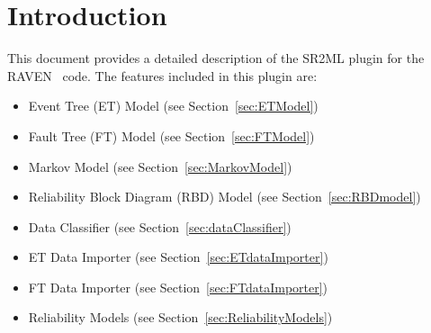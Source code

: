 \section{Introduction}
\label{sec:Introduction}

This document provides a detailed description of the SR2ML plugin for the RAVEN~\cite{RAVEN,RAVENtheoryMan} code.
The features included in this plugin are:
\begin{itemize}
	\item Event Tree (ET) Model (see Section~\ref{sec:ETModel})
	\item Fault Tree (FT) Model (see Section~\ref{sec:FTModel})
	\item Markov Model (see Section~\ref{sec:MarkovModel})
	\item Reliability Block Diagram (RBD) Model (see Section~\ref{sec:RBDmodel})
	\item Data Classifier (see Section~\ref{sec:dataClassifier})
	\item ET Data Importer (see Section~\ref{sec:ETdataImporter})
	\item FT Data Importer (see Section~\ref{sec:FTdataImporter})
	\item Reliability Models (see Section~\ref{sec:ReliabilityModels})
\end{itemize}
